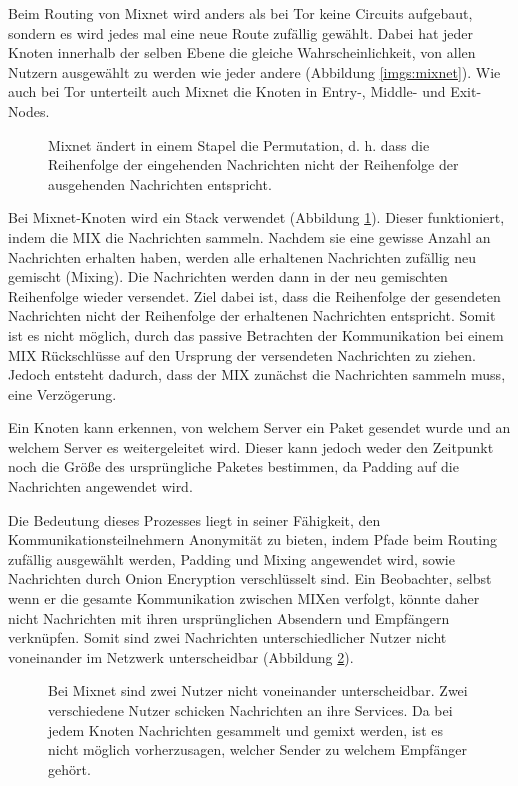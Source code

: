 Beim Routing von Mixnet wird anders als bei Tor keine Circuits aufgebaut, sondern es wird jedes mal eine neue Route zufällig gewählt. Dabei hat jeder Knoten innerhalb der selben Ebene die gleiche Wahrscheinlichkeit, von allen Nutzern ausgewählt zu werden wie jeder andere (Abbildung \ref{imgs:mixnet})\cite{MixnetRouteAlgorithm}. Wie auch bei Tor unterteilt auch Mixnet die Knoten in Entry-, Middle- und Exit-Nodes.

\begin{figure}[h!]
    \centering
    
    \caption{Mixnet ändert in einem Stapel die Permutation, d. h. dass die Reihenfolge der eingehenden Nachrichten nicht der Reihenfolge der ausgehenden Nachrichten entspricht.}
    \label{imgs:mixnet_stack}
\end{figure}

Bei Mixnet-Knoten wird ein Stack verwendet (Abbildung \ref{imgs:mixnet_stack}). Dieser funktioniert, indem die MIX die Nachrichten sammeln. Nachdem sie eine gewisse Anzahl an Nachrichten erhalten haben, werden alle erhaltenen Nachrichten zufällig neu gemischt (Mixing). Die Nachrichten werden dann in der neu gemischten Reihenfolge wieder versendet. Ziel dabei ist, dass die Reihenfolge der gesendeten Nachrichten nicht der Reihenfolge der erhaltenen Nachrichten entspricht. Somit ist es nicht möglich, durch das passive Betrachten der Kommunikation bei einem MIX Rückschlüsse auf den Ursprung der versendeten Nachrichten zu ziehen. Jedoch entsteht dadurch, dass der MIX zunächst die Nachrichten sammeln muss, eine Verzögerung\cite{MixnetStack}.

Ein Knoten kann erkennen, von welchem Server ein Paket gesendet wurde und an welchem Server es weitergeleitet wird. Dieser kann jedoch weder den Zeitpunkt noch die Größe des ursprüngliche Paketes bestimmen, da Padding auf die Nachrichten angewendet wird.

Die Bedeutung dieses Prozesses liegt in seiner Fähigkeit, den Kommunikationsteilnehmern Anonymität zu bieten, indem Pfade beim Routing zufällig ausgewählt werden, Padding und Mixing angewendet wird, sowie Nachrichten durch Onion Encryption verschlüsselt sind. Ein Beobachter, selbst wenn er die gesamte Kommunikation zwischen MIXen verfolgt, könnte daher nicht Nachrichten mit ihren ursprünglichen Absendern und Empfängern verknüpfen. Somit sind zwei Nachrichten unterschiedlicher Nutzer nicht voneinander im Netzwerk unterscheidbar (Abbildung \ref{imgs:mixnet_transfer}).

\begin{figure}[ht!]
    \centering
    
    \caption{Bei Mixnet sind zwei Nutzer nicht voneinander unterscheidbar. Zwei verschiedene Nutzer schicken Nachrichten an ihre Services. Da bei jedem Knoten Nachrichten gesammelt und gemixt werden, ist es nicht möglich vorherzusagen, welcher Sender zu welchem Empfänger gehört.}
    \label{imgs:mixnet_transfer}
\end{figure}

